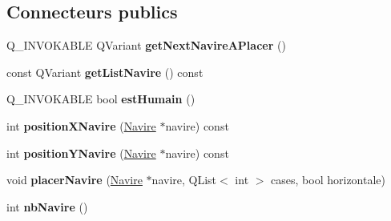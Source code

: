 \subsection*{Connecteurs publics}
\begin{DoxyCompactItemize}
\item 
Q\+\_\+\+I\+N\+V\+O\+K\+A\+B\+LE Q\+Variant {\bfseries get\+Next\+Navire\+A\+Placer} ()\hypertarget{class_joueur_ab5bdd0ac7f43d430a91ed9521d92cacd}{}\label{class_joueur_ab5bdd0ac7f43d430a91ed9521d92cacd}

\item 
const Q\+Variant {\bfseries get\+List\+Navire} () const \hypertarget{class_joueur_aa8dc64eecabea9282cc6bc7634434cbd}{}\label{class_joueur_aa8dc64eecabea9282cc6bc7634434cbd}

\item 
Q\+\_\+\+I\+N\+V\+O\+K\+A\+B\+LE bool {\bfseries est\+Humain} ()\hypertarget{class_joueur_ac9330f6d335cdb5ad1a50a292945135d}{}\label{class_joueur_ac9330f6d335cdb5ad1a50a292945135d}

\item 
int {\bfseries position\+X\+Navire} (\hyperlink{class_navire}{Navire} $\ast$navire) const \hypertarget{class_joueur_a700a86d9e204507bc67f4aa2d8ab26a8}{}\label{class_joueur_a700a86d9e204507bc67f4aa2d8ab26a8}

\item 
int {\bfseries position\+Y\+Navire} (\hyperlink{class_navire}{Navire} $\ast$navire) const \hypertarget{class_joueur_a902dbe595e80886dd8d26a06be2c4fa6}{}\label{class_joueur_a902dbe595e80886dd8d26a06be2c4fa6}

\item 
void {\bfseries placer\+Navire} (\hyperlink{class_navire}{Navire} $\ast$navire, Q\+List$<$ int $>$ cases, bool horizontale)\hypertarget{class_joueur_a64d0164fe784e5f348612cd536ab86f4}{}\label{class_joueur_a64d0164fe784e5f348612cd536ab86f4}

\item 
int {\bfseries nb\+Navire} ()\hypertarget{class_joueur_a26d44b10a21dad6e35ab26e6556071bf}{}\label{class_joueur_a26d44b10a21dad6e35ab26e6556071bf}

\end{DoxyCompactItemize}
